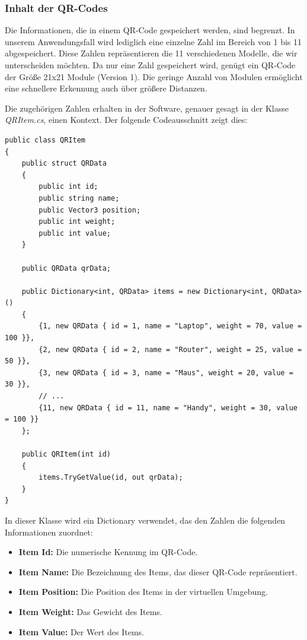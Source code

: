 \subsubsection{Inhalt der QR-Codes}
Die Informationen, die in einem QR-Code gespeichert werden, sind begrenzt. In unserem Anwendungsfall wird lediglich eine
einzelne Zahl im Bereich von 1 bis 11 abgespeichert. Diese Zahlen repräsentieren die 11 verschiedenen Modelle, die wir
unterscheiden möchten. Da nur eine Zahl gespeichert wird, genügt ein QR-Code der Größe 21x21 Module (Version 1). Die
geringe Anzahl von Modulen ermöglicht eine schnellere Erkennung auch über größere Distanzen.

Die zugehörigen Zahlen erhalten in der Software, genauer gesagt in der Klasse \textit{QRItem.cs}, einen Kontext. Der folgende Codeausschnitt zeigt dies:

\begin{lstlisting}[style=csharp, caption={}, label=code:update]
public class QRItem
{
    public struct QRData
    {
        public int id;
        public string name;
        public Vector3 position;
        public int weight;
        public int value;
    }

    public QRData qrData;

    public Dictionary<int, QRData> items = new Dictionary<int, QRData>()
    {
        {1, new QRData { id = 1, name = "Laptop", weight = 70, value = 100 }},
        {2, new QRData { id = 2, name = "Router", weight = 25, value = 50 }},
        {3, new QRData { id = 3, name = "Maus", weight = 20, value = 30 }},
        // ...
        {11, new QRData { id = 11, name = "Handy", weight = 30, value = 100 }}
    };

    public QRItem(int id)
    {
        items.TryGetValue(id, out qrData);
    }
}
\end{lstlisting}

In dieser Klasse wird ein Dictionary verwendet, das den Zahlen die folgenden Informationen zuordnet:

\begin{itemize}
    \item \textbf{Item Id:} Die numerische Kennung im QR-Code.
    \item \textbf{Item Name:} Die Bezeichnung des Items, das dieser QR-Code repräsentiert.
    \item \textbf{Item Position:} Die Position des Items in der virtuellen Umgebung.
    \item \textbf{Item Weight:} Das Gewicht des Items.
    \item \textbf{Item Value:} Der Wert des Items.
\end{itemize}

